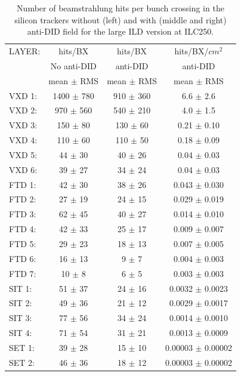 \begin{table}
\begin{center}
\begin{tabular}{ l c c c }
\toprule
LAYER: & hits/BX & hits/BX & hits/BX/$cm^2$ \\
& No anti-DID & anti-DID & anti-DID \\
& mean $\pm$ RMS & mean $\pm$ RMS & mean $\pm$ RMS \\
\midrule
VXD 1: & 1400 $\pm$ 780 & 910 $\pm$ 360 & 6.6 $\pm$ 2.6 \\
VXD 2: & 970 $\pm$ 560  & 540 $\pm$ 210 & 4.0 $\pm$ 1.5 \\
VXD 3: & 150 $\pm$ 80   & 130 $\pm$ 60  & 0.21 $\pm$ 0.10 \\
VXD 4: & 110 $\pm$ 60   & 110 $\pm$ 50  & 0.18 $\pm$ 0.09 \\
VXD 5: & 44 $\pm$ 30    & 40 $\pm$ 26   & 0.04 $\pm$ 0.03 \\
VXD 6: & 39 $\pm$ 27    & 34 $\pm$ 24   & 0.04 $\pm$ 0.03 \\
\midrule
FTD 1: & 42 $\pm$ 30 & 38 $\pm$ 26 & 0.043 $\pm$ 0.030 \\
FTD 2: & 27 $\pm$ 19 & 24 $\pm$ 15 & 0.029 $\pm$ 0.019 \\
FTD 3: & 62 $\pm$ 45 & 40 $\pm$ 27 & 0.014 $\pm$ 0.010 \\
FTD 4: & 42 $\pm$ 33 & 25 $\pm$ 17 & 0.009 $\pm$ 0.007 \\
FTD 5: & 29 $\pm$ 23 & 18 $\pm$ 13 & 0.007 $\pm$ 0.005 \\
FTD 6: & 16 $\pm$ 13 & 9 $\pm$ 7   & 0.004 $\pm$ 0.003 \\
FTD 7: & 10 $\pm$ 8  & 6 $\pm$ 5   & 0.003 $\pm$ 0.003 \\
\midrule
SIT 1: & 51 $\pm$ 37 & 24 $\pm$ 16 & 0.0032 $\pm$ 0.0023 \\
SIT 2: & 49 $\pm$ 36 & 21 $\pm$ 12 & 0.0029 $\pm$ 0.0017 \\
SIT 3: & 77 $\pm$ 56 & 34 $\pm$ 24 & 0.0014 $\pm$ 0.0010 \\
SIT 4: & 71 $\pm$ 54 & 31 $\pm$ 21 & 0.0013 $\pm$ 0.0009 \\
\midrule
SET 1: & 39 $\pm$ 28 & 15 $\pm$ 10 & 0.00003 $\pm$ 0.00002 \\
SET 2: & 46 $\pm$ 36 & 18 $\pm$ 12 & 0.00003 $\pm$ 0.00002 \\
\bottomrule
\end{tabular}
\end{center}
\caption{\label{ild:tab:BGhits}Number of beamstrahlung hits per bunch crossing in the silicon trackers without (left) and with (middle and right) anti-DID field for the large ILD version at ILC250.}
\end{table}



